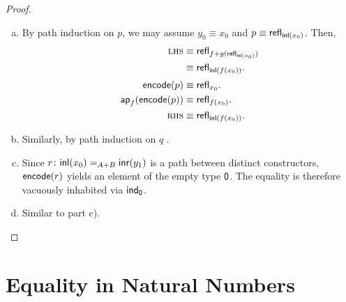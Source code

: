 \begin{proof}${}$
    \begin{enumerate}[a),font=\upshape]
        \item By path induction on $p$, we may assume $y_0\equiv x_0$ and $p\equiv\mathsf{refl}_{\mathsf{inl}(x_0)}$. Then,
        \begin{align*}
            \textsc{lhs}&\equiv
                \mathsf{refl}_{f+g(\mathsf{refl}_{\mathsf{inl}(x_0)})}\\
                &\equiv\mathsf{refl}_{\mathsf{inl}(f(x_0))}.\\[1mm]
            \mathsf{encode}(p)&\equiv\mathsf{refl}_{x_0}.\\
            \mathsf{ap}_f(\mathsf{encode}(p))&\equiv
                \mathsf{refl}_{f(x_0)}.\\
            \textsc{rhs}&\equiv\mathsf{refl}_{\mathsf{inl}(f(x_0))}.
        \end{align*}

        \item Similarly, by path induction on $q$
        .
        \item Since $r\colon\fun{inl}(x_0)\eq{A+B}\fun{inr}(y_1)$ is a path between distinct constructors, $\mathsf{encode}(r)$ yields an element of the empty type $\mathsf{0}$. The equality is therefore vacuously inhabited via $\mathsf{ind}_{\mathsf{0}}$.
        
        \item Similar to part c).
    \end{enumerate}
\end{proof}

\section{Equality in Natural Numbers}\label{equality-in-N}

